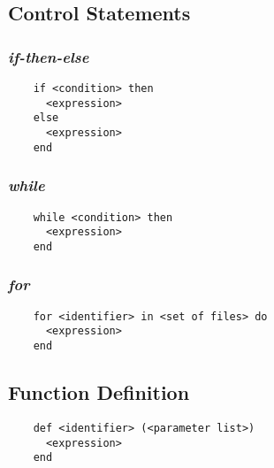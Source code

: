 \documentclass[11pt]{article}
\begin{document}
\newpage

\subsection{Control Statements}
\subsubsection{\emph{if-then-else}}
\begin{listing}[H]
  \begin{verbatim}
    if <condition> then
      <expression>
    else
      <expression>
    end
  \end{verbatim}
  \label{lst:the-code}
\end{listing}

\subsubsection{\emph{while}}
\begin{listing}[H]
  \begin{verbatim}
    while <condition> then
      <expression>
    end
  \end{verbatim}
  \label{lst:the-code}
\end{listing}

\subsubsection{\emph{for}}
\begin{listing}[H]
  \begin{verbatim}
    for <identifier> in <set of files> do
      <expression>
    end
  \end{verbatim}
  \label{lst:the-code}
\end{listing}
\subsection{Function Definition}
\begin{listing}[H]
  \begin{verbatim}
    def <identifier> (<parameter list>)
      <expression>
    end
  \end{verbatim}
  \label{lst:the-code}
\end{listing}
\end{document}
